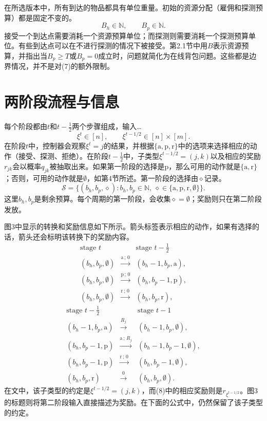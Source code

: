 \documentclass{article}
\begin{document}
在所选版本中，所有到达的物品都具有单位重量。初始的资源分配（雇佣和探测预算）都是固定不变的。
\[
B_h\in\mathbb N,\qquad B_p\in\mathbb N.
\]
接受一个到达点需要消耗一个资源预算单位；而探测则需要消耗一个探测预算单位。有些到达点可以在不进行探测的情况下被接受。第2.1节中用$B$表示资源预算，并指出当$B_p\ge T$或$B_p=0$成立时，问题就简化为在线背包问题。这些都是边界情况，并不是对(7)的额外限制。

\section*{两阶段流程与信息}
每个阶段都由$t$和$t-\tfrac12$两个步骤组成，输入…
\[
\xi^t\in[n],\qquad
\xi^{t-1/2}\in[n]\times[m].
\]
在阶段$t$中，控制器会观察$\xi^t=j$的结果，并根据$\{\mathrm a,\mathrm p,\mathrm r\}$中的选项来选择相应的动作（接受、探测、拒绝）。在阶段$t-\tfrac12$中，子类型$\xi^{t-1/2}=(j,k)$以及相应的奖励$r_{jk}$会以概率$q_{jk}$被抽取出来。如果第一阶段的选择是$\mathrm p$，那么可用的动作就是$\{\mathrm a,\mathrm r\}$；否则，可用的动作就是$\emptyset$，如第4节所述。第一阶段的选择由$\diamond$记录。
\[
\mathcal S=\{(b_h,b_p,\diamond):b_h,b_p\in\mathbb N,
\ \diamond\in\{\mathrm a,\mathrm p,\mathrm r,\emptyset\}\}.
\]
这里$b_h,b_p$是剩余预算。每个周期的第一阶段，会收集$\diamond=\emptyset$；奖励则只在第二阶段发放。

图3中显示的转换和奖励信息如下所示。箭头标签表示相应的动作，如果有选择的话，箭头还会标明该转换下的奖励内容。
\[
\begin{array}{ccl}
\text{stage }t&&\text{stage }t-\tfrac12\\[2pt]
(b_h,b_p,\emptyset)&\xrightarrow{\mathrm a\,;\,0}&(b_h-1,b_p,\mathrm a),\\
(b_h,b_p,\emptyset)&\xrightarrow{\mathrm p\,;\,0}&(b_h,b_p-1,\mathrm p),\\
(b_h,b_p,\emptyset)&\xrightarrow{\mathrm r\,;\,0}&(b_h,b_p,\mathrm r),
\end{array}
\]
\[
\begin{array}{ccl}
\text{stage }t-\tfrac12&&\text{stage }t-1\\[2pt]
(b_h-1,b_p,\mathrm a)&\xrightarrow{R_j}&(b_h-1,b_p,\emptyset),\\
(b_h,b_p-1,\mathrm p)&\xrightarrow{\mathrm a\,;\,R_j}&(b_h-1,b_p-1,\emptyset),\\
(b_h,b_p-1,\mathrm p)&\xrightarrow{\mathrm r\,;\,0}&(b_h,b_p-1,\emptyset),\\
(b_h,b_p,\mathrm r)&\xrightarrow{0}&(b_h,b_p,\emptyset).
\end{array}
\]
在文中，该子类型的约定是$\xi^{t-1/2}=(j,k)$，而(8)中的相应奖励则是$r_{\xi^{t-1/2}}$。图3的标题则将第二阶段输入直接描述为奖励。在下面的公式中，仍然保留了该子类型的约定。
\end{document}
